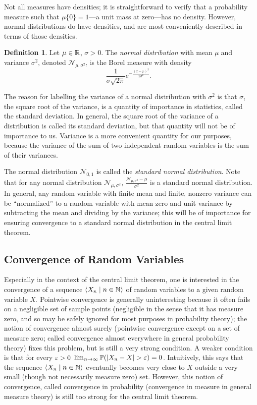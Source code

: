 \documentclass[leqno]{article}
\theoremstyle{definition}
\newtheorem{definition}[theorem]{Definition}
\newcommand{\bldseq}[2]{\langle{#1}\mid{#2}\rangle}
\begin{document}
Not all measures have densities; it is straightforward to verify that a probability measure such that $\mu \{0\} = 1$---a unit mass at zero---has no density. However, normal distributions do have densities, and are most conveniently described in terms of those densities.

\begin{definition}
Let $\mu \in \mathbb{R}$, $\sigma > 0$. The {\em normal distribution} with mean $\mu$ and variance $\sigma^2$, denoted $\mathcal N_{\mu, \sigma^2}$, is the Borel measure with density
\[ \frac{1}{\sigma \sqrt{2\pi}} e^{-\frac{(x-\mu)^2}{2\sigma^2}}. \]
\end{definition}

The reason for labelling the variance of a normal distribution with $\sigma^2$ is that $\sigma$, the square root of the variance, is a quantity of importance in statistics, called the standard deviation. In general, the square root of the variance of a distribution is called its standard deviation, but that quantity will not be of importance to us. Variance is a more convenient quantity for our purposes, because the variance of the sum of two independent random variables is the sum of their variances.

The normal distribution $\mathcal N_{0,1}$ is called the {\em standard normal distribution}. Note that for any normal distribution $\mathcal N_{\mu, \sigma^2}$, $\frac{\mathcal N_{\mu, \sigma^2} - \mu}{\sigma^2}$ is a standard normal distribution. In general, any random variable with finite mean and finite, nonzero variance can be ``normalized'' to a random variable with mean zero and unit variance by subtracting the mean and dividing by the variance; this will be of importance for ensuring convergence to a standard normal distribution in the central limit theorem.

\subsection{Convergence of Random Variables}

Especially in the context of the central limit theorem, one is interested in the convergence of a sequence $\bldseq{X_n}{n \in \N}$ of random variables to a given random variable $X$. Pointwise convergence is generally uninteresting because it often fails on a negligible set of sample points (negligible in the sense that it has measure zero, and so may be safely ignored for most purposes in probability theory); the notion of convergence almost surely (pointwise convergence except on a set of measure zero; called convergence almost everywhere in general probability theory) fixes this problem, but is still a very strong condition. A weaker condition is that for every $\varepsilon > 0$ $\lim_{n \rightarrow \infty} \mathbb{P}(|X_n - X| > \varepsilon) = 0$. Intuitively, this says that the sequence $\bldseq{X_n}{n \in \N}$ eventually becomes very close to $X$ outside a very small (though not necessarily measure zero) set. However, this notion of convergence, called convergence in probability (convergence in measure in general measure theory) is still too strong for the central limit theorem.
\end{document}

